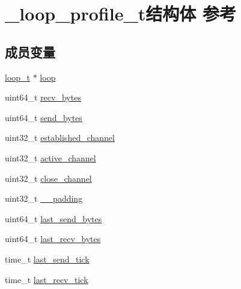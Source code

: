 \hypertarget{a00031}{}\section{\+\_\+loop\+\_\+profile\+\_\+t结构体 参考}
\label{a00031}
\subsection*{成员变量}
\begin{DoxyCompactItemize}
\item 
\hyperlink{a00050_a9c3ad1cd2de83e09f3a7b59fa82c94ee_a9c3ad1cd2de83e09f3a7b59fa82c94ee}{loop\+\_\+t} $\ast$ \hyperlink{a00031_a980ff537ba150044fae36b625ad23461_a980ff537ba150044fae36b625ad23461}{loop}
\item 
uint64\+\_\+t \hyperlink{a00031_a65c0413fffa7982e7a7c99e630e2d94b_a65c0413fffa7982e7a7c99e630e2d94b}{recv\+\_\+bytes}
\item 
uint64\+\_\+t \hyperlink{a00031_a1c6ce181c5e47d5aa0692e380dae50b9_a1c6ce181c5e47d5aa0692e380dae50b9}{send\+\_\+bytes}
\item 
uint32\+\_\+t \hyperlink{a00031_a14f2e0a88263ec993c3422f496c6df95_a14f2e0a88263ec993c3422f496c6df95}{established\+\_\+channel}
\item 
uint32\+\_\+t \hyperlink{a00031_aea9f252921f18ca335ca244adcbc1f94_aea9f252921f18ca335ca244adcbc1f94}{active\+\_\+channel}
\item 
uint32\+\_\+t \hyperlink{a00031_a30be05315677dc2d0ddf42811832f7c6_a30be05315677dc2d0ddf42811832f7c6}{close\+\_\+channel}
\item 
uint32\+\_\+t \hyperlink{a00031_a47cbcecd9e5d3bb3688de5912a875d3b_a47cbcecd9e5d3bb3688de5912a875d3b}{\+\_\+\+\_\+padding}
\item 
uint64\+\_\+t \hyperlink{a00031_afdea29d3429c7aa8b40da4275ba97461_afdea29d3429c7aa8b40da4275ba97461}{last\+\_\+send\+\_\+bytes}
\item 
uint64\+\_\+t \hyperlink{a00031_a63c0674ce1803ad482ee9b1eaa341537_a63c0674ce1803ad482ee9b1eaa341537}{last\+\_\+recv\+\_\+bytes}
\item 
time\+\_\+t \hyperlink{a00031_af099b515fd8af145f73e2c0f34f9b2d8_af099b515fd8af145f73e2c0f34f9b2d8}{last\+\_\+send\+\_\+tick}
\item 
time\+\_\+t \hyperlink{a00031_a3b6534102a76073064474ccc8897a964_a3b6534102a76073064474ccc8897a964}{last\+\_\+recv\+\_\+tick}
\end{DoxyCompactItemize}


